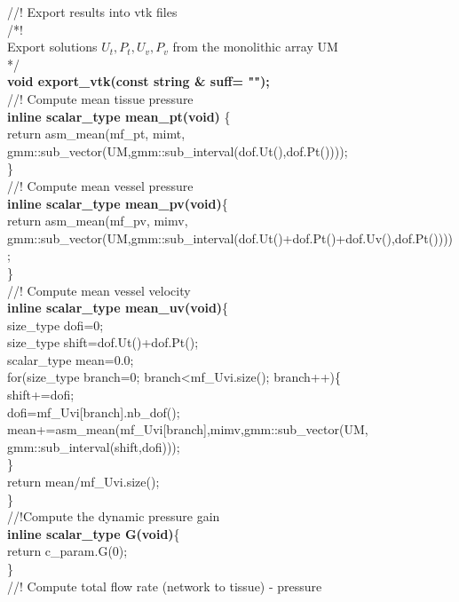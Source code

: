 \documentclass[a4paper]{report}
\newcommand\tab[1][1cm]{\hspace*{#1}}
\begin{document}
{//! Export results into vtk files\\
/*!\\
\tab Export solutions $ U_t , P_t , U_v , P_v $ from the monolithic array UM\\
*/\\
\textbf{void export\_\-vtk(const string \& suff= "");}\\
//! Compute mean tissue pressure\\
\textbf{inline scalar\_\-type mean\_\-pt(void) }\{\\ \tab return asm\_\-mean(mf\_\-pt, mimt,\\ \tab \tab gmm::sub\_\-vector(UM,gmm::sub\_\-interval(dof.Ut(),dof.Pt())));\\ \} \\
//! Compute mean vessel pressure\\
\textbf{inline scalar\_\-type mean\_\-pv(void)}\{\\ 
\tab return asm\_\-mean(mf\_\-pv, mimv,
\\ \tab \tab gmm::sub\_\-vector(UM,gmm::sub\_\-interval(dof.Ut()+dof.Pt()+dof.Uv(),dof.Pt())));\\ \} \\
//! Compute mean vessel velocity\\
\textbf{inline scalar\_\-type mean\_\-uv(void)}\{\\
\tab size\_\-type dofi=0;\\
\tab size\_\-type shift=dof.Ut()+dof.Pt();\\
\tab scalar\_\-type mean=0.0;\\
\tab for(size\_\-type branch=0; branch<mf\_\-Uvi.size(); branch++)\{\\
\tab \tab shift+=dofi;\\
\tab \tab dofi=mf\_\-Uvi[branch].nb\_\-dof();\\
\tab \tab mean+=asm\_\-mean(mf\_\-Uvi[branch],mimv,gmm::sub\_\-vector(UM,\\
\tab \tab \tab gmm::sub\_\-interval(shift,dofi)));\\
\tab \}\\
\tab return mean/mf\_\-Uvi.size();\\
\}\\
//!Compute the dynamic pressure gain\\
\textbf{inline scalar\_\-type G(void)}\{\\
\tab return c\_\-param.G(0);\\
\}\\
//! Compute total flow rate (network to tissue) - pressure\\
}
\end{document}
